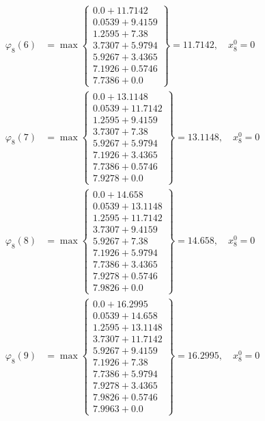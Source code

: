 \documentclass{article}
\begin{document}
\begin{align*}
\varphi_{8}(6) &= \max \left\{ \begin{array}{c}
0.0 + 11.7142 \\
 0.0539 + 9.4159 \\
 1.2595 + 7.38 \\
 3.7307 + 5.9794 \\
 5.9267 + 3.4365 \\
 7.1926 + 0.5746 \\
 7.7386 + 0.0
\end{array} \right\}=11.7142, \quad x_{8}^0=0\\
  
\varphi_{8}(7) &= \max \left\{ \begin{array}{c}
0.0 + 13.1148 \\
 0.0539 + 11.7142 \\
 1.2595 + 9.4159 \\
 3.7307 + 7.38 \\
 5.9267 + 5.9794 \\
 7.1926 + 3.4365 \\
 7.7386 + 0.5746 \\
 7.9278 + 0.0
\end{array} \right\}=13.1148, \quad x_{8}^0=0\\
  
\varphi_{8}(8) &= \max \left\{ \begin{array}{c}
0.0 + 14.658 \\
 0.0539 + 13.1148 \\
 1.2595 + 11.7142 \\
 3.7307 + 9.4159 \\
 5.9267 + 7.38 \\
 7.1926 + 5.9794 \\
 7.7386 + 3.4365 \\
 7.9278 + 0.5746 \\
 7.9826 + 0.0
\end{array} \right\}=14.658, \quad x_{8}^0=0\\
  
\varphi_{8}(9) &= \max \left\{ \begin{array}{c}
0.0 + 16.2995 \\
 0.0539 + 14.658 \\
 1.2595 + 13.1148 \\
 3.7307 + 11.7142 \\
 5.9267 + 9.4159 \\
 7.1926 + 7.38 \\
 7.7386 + 5.9794 \\
 7.9278 + 3.4365 \\
 7.9826 + 0.5746 \\
 7.9963 + 0.0
\end{array} \right\}=16.2995, \quad x_{8}^0=0\\
  

\end{align*}
\end{document}
